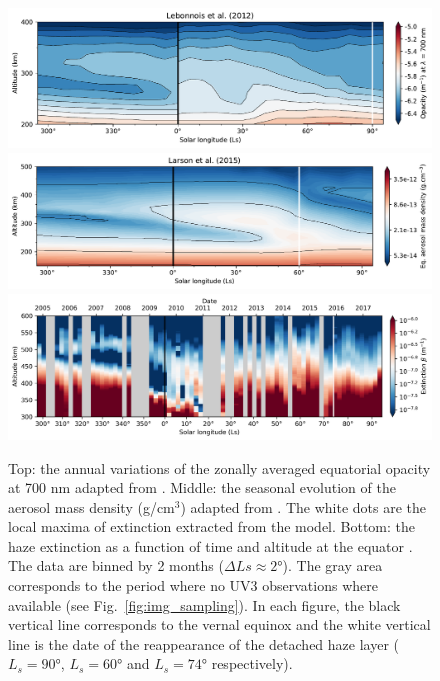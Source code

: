 \begin{figure}[!ht]
    \centering
    \includegraphics[width=.8\textwidth]{Fig/Lebonnois2012_dhl_cycle}
    \includegraphics[width=.8\textwidth]{Fig/Larson2015_dhl_cycle}
    \includegraphics[width=.8\textwidth]{Fig/DHL_time_eq.png}
    \caption{Top: the annual variations of the zonally averaged equatorial opacity at 700 nm adapted
        from \cite{Lebonnois2012}.
        Middle: the seasonal evolution of the aerosol mass density (g/cm$^3$) adapted from \cite{Larson2015}.
        The white dots are the local maxima of extinction extracted from the model.
        Bottom: the haze extinction as a function of time and altitude at the equator \citep[completed since][]{West2018}.
        The data are binned by 2 months ($\Delta Ls \approx \ang{2} $). The gray area corresponds to the period where
        no UV3 observations where available (see Fig.~\ref{fig:img_sampling}).
        In each figure, the black vertical line corresponds to the vernal equinox and the white vertical
        line is the date of the reappearance of the detached haze layer ($L_s = \ang{90}$, $L_s = \ang{60}$
        and $L_s = \ang{74}$ respectively).
    }
    \label{fig:gcm_cycle}
\end{figure}

